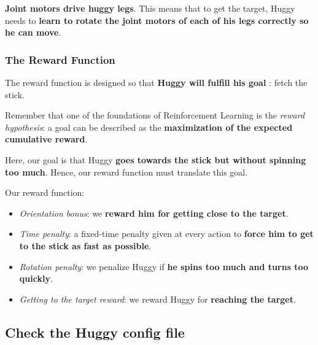 \documentclass[11pt,a4paper]{article}
\begin{document}

\textbf{Joint motors drive huggy legs}. This means that to get the target, Huggy needs to \textbf{learn to rotate the joint motors of each of his legs correctly so he can move}.

\subsubsection{The Reward Function}\label{the-reward-function-1}

The reward function is designed so that \textbf{Huggy will fulfill his goal} : fetch the stick.

Remember that one of the foundations of Reinforcement Learning is the \emph{reward hypothesis}: a goal can be described as the \textbf{maximization of the expected cumulative reward}.

Here, our goal is that Huggy \textbf{goes towards the stick but without spinning too much}. Hence, our reward function must translate this goal.

Our reward function:


\begin{itemize}
\tightlist
\item
  \emph{Orientation bonus}: we \textbf{reward him for getting close to the target}.
\item
  \emph{Time penalty}: a fixed-time penalty given at every action to \textbf{force him to get to the stick as fast as possible}.
\item
  \emph{Rotation penalty}: we penalize Huggy if \textbf{he spins too much and turns too quickly}.
\item
  \emph{Getting to the target reward}: we reward Huggy for \textbf{reaching the target}.
\end{itemize}

\subsection{Check the Huggy config file}\label{check-the-huggy-config-file}
\end{document}
